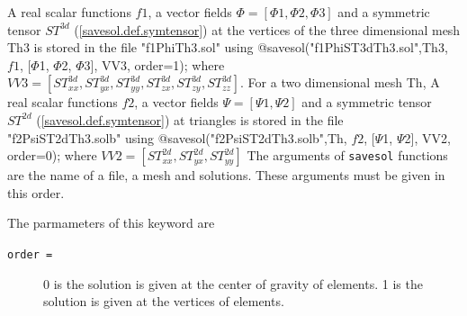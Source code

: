 \documentclass[a4paper,twoside,12pt]{book}
\begin{document}
A real scalar functions $f1$, a vector fields $\Phi=[\Phi1,\Phi2,\Phi3]$ and a symmetric tensor $ST^{3d}$
(\ref{savesol.def.symtensor}) at the vertices of the three dimensional mesh Th3 is stored in the file "f1PhiTh3.sol" using
\bFF
@savesol("f1PhiST3dTh3.sol",Th3, $f1$, [$\Phi$1, $\Phi$2, $\Phi$3], VV3, order=1);
\eFF
where $VV3=[ ST_{xx}^{3d}, ST_{yx}^{3d}, ST_{yy}^{3d}, ST_{zx}^{3d}, ST_{zy}^{3d}, ST_{zz}^{3d}]$.
For a two dimensional mesh Th, A real scalar functions $f2$, a vector fields $\Psi=[\Psi1,\Psi2]$ and a symmetric tensor $ST^{2d}$
(\ref{savesol.def.symtensor}) at triangles is stored in the file "f2PsiST2dTh3.solb" using
\bFF
@savesol("f2PsiST2dTh3.solb",Th, $f2$, [$\Psi$1, $\Psi$2], VV2, order=0);
\eFF
where $VV2=[ST_{xx}^{2d}, ST_{yx}^{2d}, ST_{yy}^{2d}]$
The arguments of \texttt{savesol} functions are the name of a file, a mesh and solutions. These arguments must be given in this order.

The parmameters of this keyword are
\begin{description}
\item [\texttt{order =}] 0 is the solution is given at the center of gravity of elements.
1 is the solution is given at the vertices of elements.
\end{description}

\end{document}
